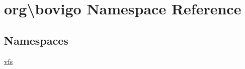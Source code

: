 \hypertarget{namespaceorg_1_1bovigo}{}\section{org\textbackslash{}bovigo Namespace Reference}
\label{namespaceorg_1_1bovigo}
\subsection*{Namespaces}
\begin{DoxyCompactItemize}
\item 
 \mbox{\hyperlink{namespaceorg_1_1bovigo_1_1vfs}{vfs}}
\end{DoxyCompactItemize}
